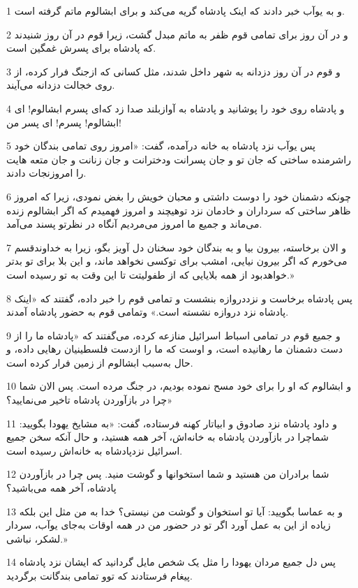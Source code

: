 \par 1 و به یوآب خبر دادند که اینک پادشاه گریه می‌کند و برای ابشالوم ماتم گرفته است.
\par 2 و در آن روز برای تمامی قوم ظفر به ماتم مبدل گشت، زیرا قوم در آن روز شنیدند که پادشاه برای پسرش غمگین است.
\par 3 و قوم در آن روز دزدانه به شهر داخل شدند، مثل کسانی که ازجنگ فرار کرده، از روی خجالت دزدانه می‌آیند.
\par 4 و پادشاه روی خود را پوشانید و پادشاه به آوازبلند صدا زد که‌ای پسرم ابشالوم! ای ابشالوم! پسرم! ای پسر من!
\par 5 پس یوآب نزد پادشاه به خانه درآمده، گفت: «امروز روی تمامی بندگان خود راشرمنده ساختی که جان تو و جان پسرانت ودخترانت و جان زنانت و جان متعه هایت را امروزنجات دادند.
\par 6 چونکه دشمنان خود را دوست داشتی و محبان خویش را بغض نمودی، زیرا که امروز ظاهر ساختی که سرداران و خادمان نزد توهیچند و امروز فهمیدم که اگر ابشالوم زنده می‌ماند و جمیع ما امروز می‌مردیم آنگاه در نظرتو پسند می‌آمد.
\par 7 و الان برخاسته، بیرون بیا و به بندگان خود سخنان دل آویز بگو، زیرا به خداوندقسم می‌خورم که اگر بیرون نیایی، امشب برای توکسی نخواهد ماند، و این بلا برای تو بدتر خواهدبود از همه بلایایی که از طفولیتت تا این وقت به تو رسیده است.»
\par 8 پس پادشاه برخاست و نزددروازه بنشست و تمامی قوم را خبر داده، گفتند که «اینک پادشاه نزد دروازه نشسته است.» وتمامی قوم به حضور پادشاه آمدند.
\par 9 و جمیع قوم در تمامی اسباط اسرائیل منازعه کرده، می‌گفتند که «پادشاه ما را از دست دشمنان ما رهانیده است، و اوست که ما را ازدست فلسطینیان رهایی داده، و حال به‌سبب ابشالوم از زمین فرار کرده است.
\par 10 و ابشالوم که او را برای خود مسح نموده بودیم، در جنگ مرده است. پس الان شما چرا در بازآوردن پادشاه تاخیر می‌نمایید؟»
\par 11 و داود پادشاه نزد صادوق و ابیاتار کهنه فرستاده، گفت: «به مشایخ یهودا بگویید: شماچرا در بازآوردن پادشاه به خانه‌اش، آخر همه هستید، و حال آنکه سخن جمیع اسرائیل نزدپادشاه به خانه‌اش رسیده است.
\par 12 شما برادران من هستید و شما استخوانها و گوشت منید. پس چرا در بازآوردن پادشاه، آخر همه می‌باشید؟
\par 13 و به عماسا بگویید: آیا تو استخوان و گوشت من نیستی؟ خدا به من مثل این بلکه زیاده از این به عمل آورد اگر تو در حضور من در همه اوقات به‌جای یوآب، سردار لشکر، نباشی.»
\par 14 پس دل جمیع مردان یهودا را مثل یک شخص مایل گردانید که ایشان نزد پادشاه پیغام فرستادند که توو تمامی بندگانت برگردید.
